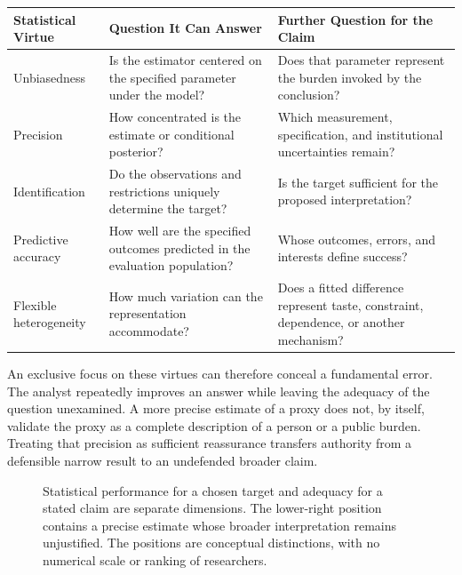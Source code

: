 \begin{table}[H]
\centering\small
\begin{tabular}{@{}
  >{\raggedright\arraybackslash}p{}
  >{\raggedright\arraybackslash}p{}
  >{\raggedright\arraybackslash}p{}@{}}
\toprule
Statistical Virtue & Question It Can Answer & Further Question for the
Claim \\
\midrule

Unbiasedness & Is the estimator centered on the specified parameter
under the model? & Does that parameter represent the burden invoked by
the conclusion? \\
Precision & How concentrated is the estimate or conditional posterior? &
Which measurement, specification, and institutional uncertainties
remain? \\
Identification & Do the observations and restrictions uniquely determine
the target? & Is the target sufficient for the proposed
interpretation? \\
Predictive accuracy & How well are the specified outcomes predicted in
the evaluation population? & Whose outcomes, errors, and interests
define success? \\
Flexible heterogeneity & How much variation can the representation
accommodate? & Does a fitted difference represent taste, constraint,
dependence, or another mechanism? \\
\bottomrule
\end{tabular}
\end{table}

An exclusive focus on these virtues can therefore conceal a fundamental
error. The analyst repeatedly improves an answer while leaving the
adequacy of the question unexamined. A more precise estimate of a proxy
does not, by itself, validate the proxy as a complete description of a
person or a public burden. Treating that precision as sufficient
reassurance transfers authority from a defensible narrow result to an
undefended broader claim.

\begin{figure}[htbp]
\centering

\caption{Statistical performance for a chosen target and adequacy for a stated claim are separate dimensions. The lower-right position contains a precise estimate whose broader interpretation remains unjustified. The positions are conceptual distinctions, with no numerical scale or ranking of researchers.}\label{fig:M09_statistical_virtues_and_ontology}
\end{figure}

